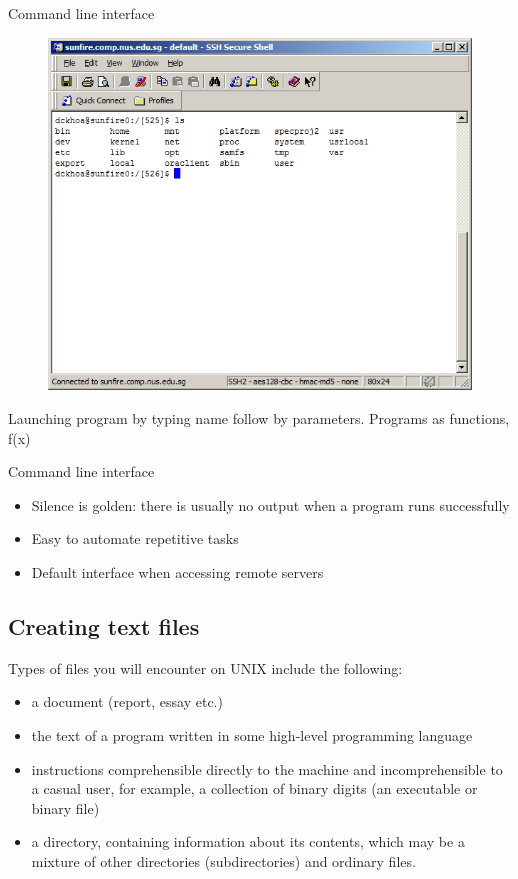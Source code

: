 \begin{frame}{Command line interface}
\begin{figure}
\begin{center}
\includegraphics[scale=0.25]{ssh_command_line}
\end{center}
\end{figure}

Launching program by typing name follow by parameters.  
Programs as functions, f(x)

\end{frame}

\begin{frame}{Command line interface}
\begin{itemize}
\item Silence is golden: there is usually no output when a program runs
successfully
\item Easy to automate repetitive tasks
\item Default interface when accessing remote servers %
\end{itemize}
\end{frame}


\subsection{Creating text files}
Types of files you will encounter on UNIX include the following:
\begin{itemize}
\item a document (report, essay etc.)
\item the text of a program written in some high-level programming language
\item instructions comprehensible directly to the machine and incomprehensible 
to a casual user, for example, a collection of binary digits (an executable or 
binary file)
\item a directory, containing information about its contents, which may be a 
mixture of other directories (subdirectories) and ordinary files.
\end{itemize}

